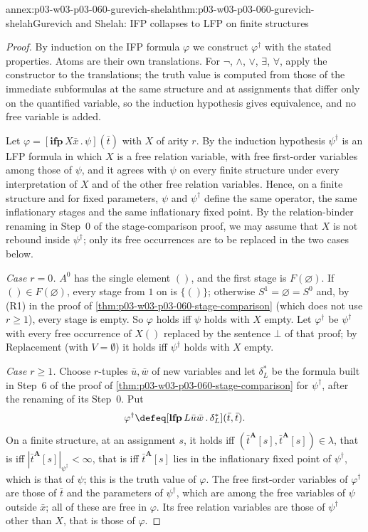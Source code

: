 \begin{annexitem}{annex:p03-w03-p03-060-gurevich-shelah}{thm:p03-w03-p03-060-gurevich-shelah}{Gurevich and Shelah: IFP collapses to LFP on finite structures}
\begin{proof}
By induction on the IFP formula \(\varphi\) we construct
\(\varphi^\dagger\) with the stated properties. Atoms are their own
translations. For \(\neg\), \(\wedge\), \(\vee\), \(\exists\), \(\forall\),
apply the constructor to the translations; the truth value is computed
from those of the immediate subformulas at the same structure and at
assignments that differ only on the quantified variable, so the induction
hypothesis gives equivalence, and no free variable is added.

Let \(\varphi=[\mathbf{ifp}\,X\bar x\,.\,\psi](\bar t)\) with \(X\) of
arity \(r\). By the induction hypothesis \(\psi^\dagger\) is an LFP formula
in which \(X\) is a free relation variable, with free first-order
variables among those of \(\psi\), and it agrees with \(\psi\) on every
finite structure under every interpretation of \(X\) and of the other free
relation variables. Hence, on a finite structure and for fixed
parameters, \(\psi\) and \(\psi^\dagger\) define the same operator, the
same inflationary stages and the same inflationary fixed point.
By the relation-binder renaming in Step~0 of the stage-comparison proof,
we may assume that \(X\) is not rebound inside \(\psi^\dagger\); only
its free occurrences are to be replaced in the two cases below.

\emph{Case \(r=0\).} \(A^0\) has the single element \(()\), and the first
stage is \(F(\varnothing)\). If \(()\in F(\varnothing)\), every stage from
\(1\) on is \(\{()\}\); otherwise \(S^1=\varnothing=S^0\) and, by (R1) in
the proof of \cref{thm:p03-w03-p03-060-stage-comparison} (which does not
use \(r\ge1\)), every stage is empty. So \(\varphi\) holds iff \(\psi\)
holds with \(X\) empty. Let \(\varphi^\dagger\) be \(\psi^\dagger\) with
every free occurrence of \(X()\) replaced by the sentence \(\bot\) of that proof; by
Replacement (with \(V=\emptyset\)) it holds iff \(\psi^\dagger\) holds with
\(X\) empty.

\emph{Case \(r\ge1\).} Choose \(r\)-tuples \(\bar u,\bar w\) of new
variables and let \(\delta_L^\ast\) be the formula built in Step~6 of the
proof of \cref{thm:p03-w03-p03-060-stage-comparison} for
\(\psi^\dagger\), after the renaming of its Step~0. Put
\[
 \varphi^\dagger\defeq[\mathbf{lfp}\,L\bar u\bar w\,.\,\delta_L^\ast](\bar t,\bar t).
\]
On a finite structure, at an assignment \(s\), it holds iff
\((\bar t^{\mathbf A}[s],\bar t^{\mathbf A}[s])\in\lambda\), that is iff
\(|\bar t^{\mathbf A}[s]|_{\psi^\dagger}<\infty\), that is iff
\(\bar t^{\mathbf A}[s]\) lies in the inflationary fixed point of
\(\psi^\dagger\), which is that of \(\psi\); this is the truth value of
\(\varphi\). The free first-order variables of \(\varphi^\dagger\) are those
of \(\bar t\) and the parameters of \(\psi^\dagger\), which are among the
free variables of \(\psi\) outside \(\bar x\); all of these are free in
\(\varphi\). Its free relation variables are those of \(\psi^\dagger\)
other than \(X\), that is those of \(\varphi\).


\end{proof}
\end{annexitem}
